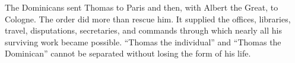 The Dominicans sent Thomas to Paris and then, with Albert the Great, to
Cologne.  The order did more than rescue him.  It supplied the offices,
libraries, travel, disputations, secretaries, and commands through which nearly
all his surviving work became possible.  ``Thomas the individual'' and
``Thomas the Dominican'' cannot be separated without losing the form of his
life.

